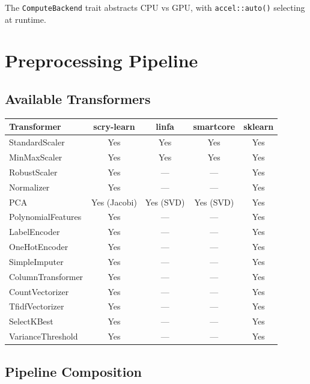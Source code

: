 \documentclass[11pt,a4paper]{article}
\begin{document}
The \texttt{ComputeBackend} trait abstracts CPU vs GPU, with \texttt{accel::auto()} selecting at runtime.


\section{Preprocessing Pipeline}

\subsection{Available Transformers}

{\small
\begin{center}
\begin{tabular}{lcccc}
\toprule
\textbf{Transformer} & \textbf{scry-learn} & \textbf{linfa} & \textbf{smartcore} & \textbf{sklearn} \\
\midrule
StandardScaler & Yes & Yes & Yes & Yes \\
MinMaxScaler & Yes & Yes & Yes & Yes \\
RobustScaler & Yes & --- & --- & Yes \\
Normalizer & Yes & --- & --- & Yes \\
PCA & Yes (Jacobi) & Yes (SVD) & Yes (SVD) & Yes \\
PolynomialFeatures & Yes & --- & --- & Yes \\
LabelEncoder & Yes & --- & --- & Yes \\
OneHotEncoder & Yes & --- & --- & Yes \\
SimpleImputer & Yes & --- & --- & Yes \\
ColumnTransformer & Yes & --- & --- & Yes \\
CountVectorizer & Yes & --- & --- & Yes \\
TfidfVectorizer & Yes & --- & --- & Yes \\
SelectKBest & Yes & --- & --- & Yes \\
VarianceThreshold & Yes & --- & --- & Yes \\
\bottomrule
\end{tabular}
\end{center}
}

\subsection{Pipeline Composition}
\end{document}
